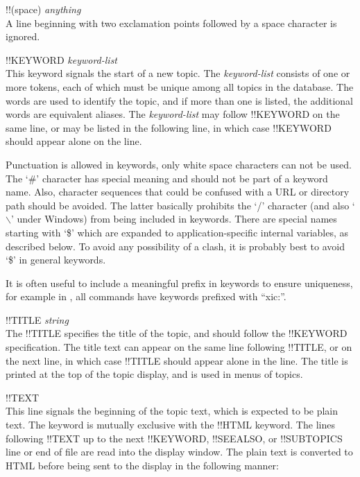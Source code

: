 \begin{description}
\item{\vt !!}(space) {\it anything}\\
A line beginning with two exclamation points followed by a space
character is ignored.

\item{\vt !!KEYWORD {\it keyword-list}}\\
This keyword signals the start of a new topic.  The {\it keyword-list}
consists of one or more tokens, each of which must be unique among all
topics in the database.  The words are used to identify the topic, and
if more than one is listed, the additional words are equivalent
aliases.  The {\it keyword-list} may follow {\vt !!KEYWORD} on the
same line, or may be listed in the following line, in which case {\vt
!!KEYWORD} should appear alone on the line.

Punctuation is allowed in keywords, only white space characters can
not be used.  The `{\vt \#}' character has special meaning and should
not be part of a keyword name.  Also, character sequences that could
be confused with a URL or directory path should be avoided.  The
latter basically prohibits the `{\vt /}' character (and also
`$\backslash$' under Windows) from being included in keywords.  There
are special names starting with `{\vt \$}' which are expanded to
application-specific internal variables, as described below.  To avoid
any possibility of a clash, it is probably best to avoid `{\vt \$}' in
general keywords.

It is often useful to include a meaningful prefix in keywords to
ensure uniqueness, for example in {\Xic}, all commands have keywords
prefixed with ``{\vt xic:}''.

\item{\vt !!TITLE {\it string}}\\
The {\vt !!TITLE} specifies the title of the topic, and should follow
the {\vt !!KEYWORD} specification.  The title text can appear on the
same line following {\vt !!TITLE}, or on the next line, in which case
{\vt !!TITLE} should appear alone in the line.  The title is printed
at the top of the topic display, and is used in menus of topics.

\item{\vt !!TEXT}\\
This line signals the beginning of the topic text, which is expected
to be plain text.  The keyword is mutually exclusive with the {\vt
!!HTML} keyword.  The lines following {\vt !!TEXT} up to the next {\vt
!!KEYWORD}, {\vt !!SEEALSO}, or {\vt !!SUBTOPICS} line or end of file
are read into the display window.  The plain text is converted to HTML
before being sent to the display in the following manner:


\end{description}
